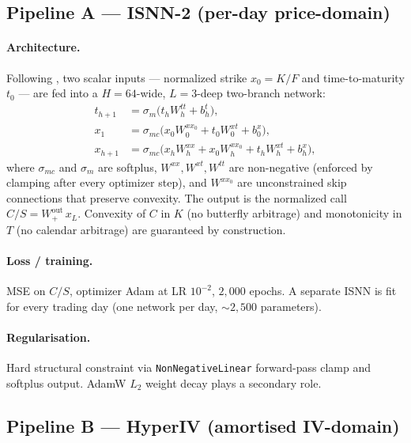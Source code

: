 \documentclass[11pt,a4paper]{article}
\begin{document}
\subsection{Pipeline A --- ISNN-2 (per-day price-domain)}
\label{sec:pipeA}

\paragraph{Architecture.} Following \citet{jadoon2025isnn}, two scalar
inputs --- normalized strike $x_0 = K/F$ and time-to-maturity $t_0$ --- are
fed into a $H{=}64$-wide, $L{=}3$-deep two-branch network:
\begin{align*}
  t_{h+1} &= \sigma_m\!\bigl(t_h W^{tt}_h + b^t_h\bigr), \\
  x_1     &= \sigma_{mc}\!\bigl(x_0 W^{xx_0}_0 + t_0 W^{xt}_0 + b^x_0\bigr), \\
  x_{h+1} &= \sigma_{mc}\!\bigl(x_h W^{xx}_h + x_0 W^{xx_0}_h + t_h W^{xt}_h + b^x_h\bigr),
\end{align*}
where $\sigma_{mc}$ and $\sigma_m$ are softplus, $W^{xx}, W^{xt}, W^{tt}$
are non-negative (enforced by clamping after every optimizer step), and
$W^{xx_0}$ are unconstrained skip connections that preserve convexity. The
output is the normalized call $C/S = W^{\mathrm{out}}_+ \, x_L$. Convexity
of $C$ in $K$ (no butterfly arbitrage) and monotonicity in $T$ (no calendar
arbitrage) are guaranteed by construction.

\paragraph{Loss / training.} MSE on $C/S$, optimizer Adam at LR $10^{-2}$,
$2{,}000$ epochs. A separate ISNN is fit for every trading day (one network
per day, $\sim$$2{,}500$ parameters).

\paragraph{Regularisation.} Hard structural constraint via
\texttt{NonNegativeLinear} forward-pass clamp and softplus output. AdamW
$L_2$ weight decay plays a secondary role.

\subsection{Pipeline B --- HyperIV (amortised IV-domain)}
\label{sec:pipeB}
\end{document}
